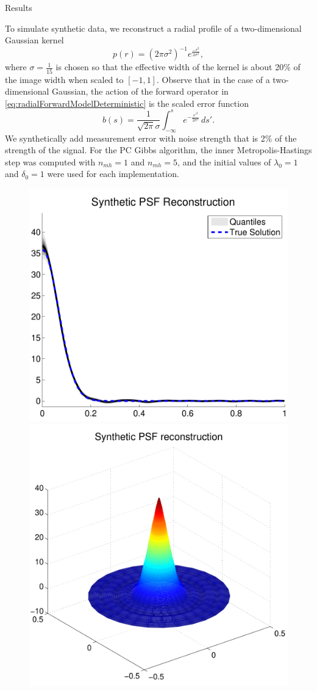 \setlength{\parindent}{2ex}
\begin{chapter}{Results}\label{chapter:results}

To simulate synthetic data, we reconstruct a radial profile of a two-dimensional Gaussian kernel
\begin{equation} \label{eq:syntheticx}
  p(r) = (2\pi\sigma^2)^{-1} e^{\frac{-r^2}{2\sigma^2}},
\end{equation}
where $\sigma = \frac1{15}$ is chosen so that the effective width of the kernel is about 20\% of the image width when scaled to $[-1,1]$.
Observe that in the case of a two-dimensional Gaussian, the action of the forward operator in \eqref{eq:radialForwardModelDeterministic} is the scaled error function
\begin{equation} \label{eq:syntheticb}
  b(s) = \frac 1{\sqrt{2\pi}\sigma} \int_{-\infty}^s e^{-\frac{s'^2}{2\sigma^2}}\,ds'.
\end{equation}
We synthetically add measurement error with noise strength that is 2\% of the strength of the signal.
For the PC Gibbs algorithm, the inner Metropolis-Hastings step was computed with $n_{mh} = 1$ and $n_{mh} = 5$, and the initial values of $\lambda_0 = 1$ and $\delta_0 = 1$ were used for each implementation.
\begin{figure}[p]
  \begin{center}
  \includegraphics[width=.4\textwidth]{figures/syntheticPSFrecon.pdf}\includegraphics[width=.4\textwidth]{figures/synthetic2dPSFrecon.pdf}

\end{center}
\end{figure}
\end{chapter}
